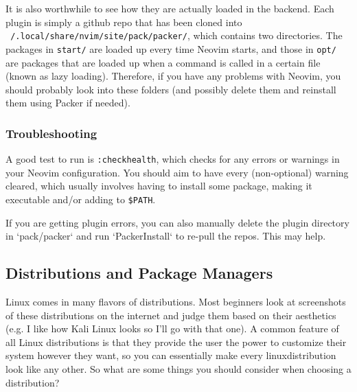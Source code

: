 \documentclass{article}
\begin{document}
      It is also worthwhile to see how they are actually loaded in the backend. Each plugin is simply a github repo that has been cloned into \texttt{~/.local/share/nvim/site/pack/packer/}, which contains two directories. The packages in \texttt{start/} are loaded up every time Neovim starts, and those in \texttt{opt/} are packages that are loaded up when a command is called in a certain file (known as lazy loading). Therefore, if you have any problems with Neovim, you should probably look into these folders (and possibly delete them and reinstall them using Packer if needed).

    \subsubsection{Troubleshooting}

      A good test to run is \texttt{:checkhealth}, which checks for any errors or warnings in your Neovim configuration. You should aim to have every (non-optional) warning cleared, which usually involves having to install some package, making it executable and/or adding to \texttt{\$PATH}. 

      If you are getting plugin errors, you can also manually delete the plugin directory in `pack/packer` and run `PackerInstall` to re-pull the repos. This may help. 

  \subsection{Distributions and Package Managers}
    
    Linux comes in many flavors of distributions. Most beginners look at screenshots of these distributions on the internet and judge them based on their aesthetics (e.g. I like how Kali Linux looks so I'll go with that one). A common feature of all Linux distributions is that they provide the user the power to customize their system however they want, so you can essentially make every linuxdistribution look like any other. So what are some things you should consider when choosing a distribution? 
  
\end{document}
